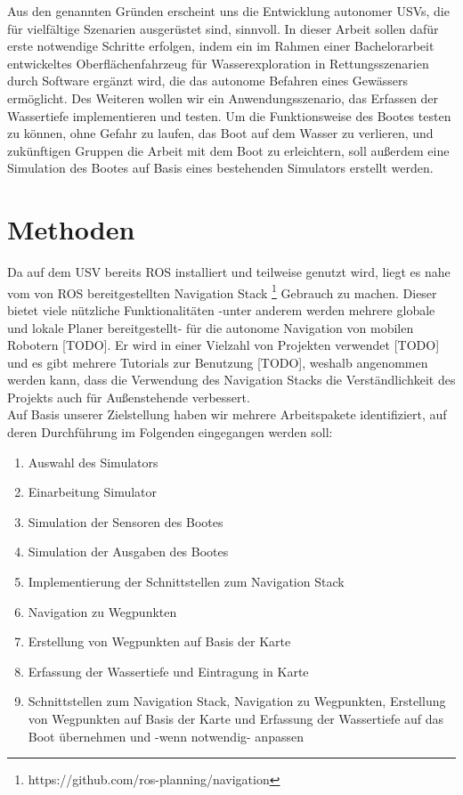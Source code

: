 \documentclass[conference]{IEEEtran}
\begin{document}
Aus den genannten Gründen erscheint uns die Entwicklung autonomer USVs, die für vielfältige Szenarien ausgerüstet sind, sinnvoll. In dieser Arbeit sollen dafür erste notwendige Schritte erfolgen, indem ein im Rahmen einer Bachelorarbeit entwickeltes Oberflächenfahrzeug für Wasserexploration in Rettungsszenarien durch Software ergänzt wird, die das autonome Befahren eines Gewässers ermöglicht. Des Weiteren wollen wir ein Anwendungsszenario, das Erfassen der Wassertiefe implementieren und testen. Um die Funktionsweise des Bootes testen zu können, ohne Gefahr zu laufen, das Boot auf dem Wasser zu verlieren, und zukünftigen Gruppen die Arbeit mit dem Boot zu erleichtern, soll außerdem eine Simulation des Bootes auf Basis eines bestehenden Simulators erstellt werden.

\section{Methoden}
Da auf dem USV bereits ROS installiert und teilweise genutzt wird, liegt es nahe vom von ROS bereitgestellten Navigation Stack \footnote{https://github.com/ros-planning/navigation} Gebrauch zu machen. Dieser bietet viele nützliche Funktionalitäten -unter anderem werden mehrere globale und lokale Planer bereitgestellt- für die autonome Navigation von mobilen Robotern [TODO]. Er wird in einer Vielzahl von Projekten verwendet [TODO] und es gibt mehrere Tutorials zur Benutzung [TODO], weshalb angenommen werden kann, dass die Verwendung des Navigation Stacks die Verständlichkeit des Projekts auch für Außenstehende verbessert.\\
Auf Basis unserer Zielstellung haben wir mehrere Arbeitspakete identifiziert, auf deren Durchführung im Folgenden eingegangen werden soll:
\begin{enumerate}
	\item Auswahl des Simulators
	\item Einarbeitung Simulator
	\item Simulation der Sensoren des Bootes
	\item Simulation der Ausgaben des Bootes
	\item Implementierung der Schnittstellen zum Navigation Stack
	\item Navigation zu Wegpunkten
	\item Erstellung von Wegpunkten auf Basis der Karte
	\item Erfassung der Wassertiefe und Eintragung in Karte
	\item Schnittstellen zum Navigation Stack, Navigation zu Wegpunkten, Erstellung von Wegpunkten auf Basis der Karte und Erfassung der Wassertiefe auf das Boot übernehmen und -wenn notwendig- anpassen
\end{enumerate}
\end{document}
